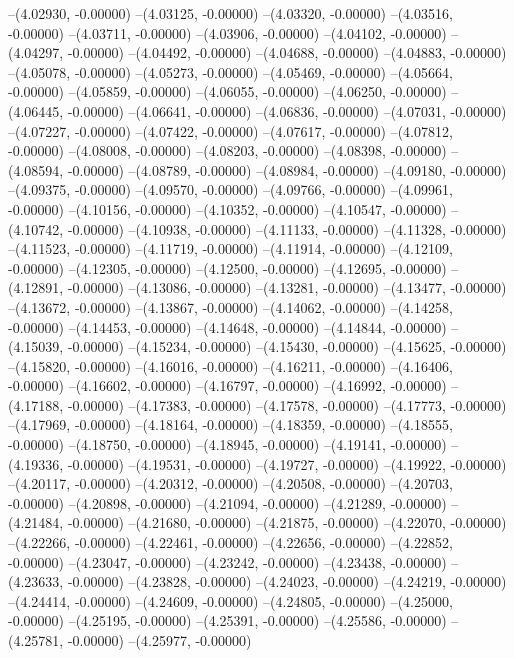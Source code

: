 --(4.02930, -0.00000)
--(4.03125, -0.00000)
--(4.03320, -0.00000)
--(4.03516, -0.00000)
--(4.03711, -0.00000)
--(4.03906, -0.00000)
--(4.04102, -0.00000)
--(4.04297, -0.00000)
--(4.04492, -0.00000)
--(4.04688, -0.00000)
--(4.04883, -0.00000)
--(4.05078, -0.00000)
--(4.05273, -0.00000)
--(4.05469, -0.00000)
--(4.05664, -0.00000)
--(4.05859, -0.00000)
--(4.06055, -0.00000)
--(4.06250, -0.00000)
--(4.06445, -0.00000)
--(4.06641, -0.00000)
--(4.06836, -0.00000)
--(4.07031, -0.00000)
--(4.07227, -0.00000)
--(4.07422, -0.00000)
--(4.07617, -0.00000)
--(4.07812, -0.00000)
--(4.08008, -0.00000)
--(4.08203, -0.00000)
--(4.08398, -0.00000)
--(4.08594, -0.00000)
--(4.08789, -0.00000)
--(4.08984, -0.00000)
--(4.09180, -0.00000)
--(4.09375, -0.00000)
--(4.09570, -0.00000)
--(4.09766, -0.00000)
--(4.09961, -0.00000)
--(4.10156, -0.00000)
--(4.10352, -0.00000)
--(4.10547, -0.00000)
--(4.10742, -0.00000)
--(4.10938, -0.00000)
--(4.11133, -0.00000)
--(4.11328, -0.00000)
--(4.11523, -0.00000)
--(4.11719, -0.00000)
--(4.11914, -0.00000)
--(4.12109, -0.00000)
--(4.12305, -0.00000)
--(4.12500, -0.00000)
--(4.12695, -0.00000)
--(4.12891, -0.00000)
--(4.13086, -0.00000)
--(4.13281, -0.00000)
--(4.13477, -0.00000)
--(4.13672, -0.00000)
--(4.13867, -0.00000)
--(4.14062, -0.00000)
--(4.14258, -0.00000)
--(4.14453, -0.00000)
--(4.14648, -0.00000)
--(4.14844, -0.00000)
--(4.15039, -0.00000)
--(4.15234, -0.00000)
--(4.15430, -0.00000)
--(4.15625, -0.00000)
--(4.15820, -0.00000)
--(4.16016, -0.00000)
--(4.16211, -0.00000)
--(4.16406, -0.00000)
--(4.16602, -0.00000)
--(4.16797, -0.00000)
--(4.16992, -0.00000)
--(4.17188, -0.00000)
--(4.17383, -0.00000)
--(4.17578, -0.00000)
--(4.17773, -0.00000)
--(4.17969, -0.00000)
--(4.18164, -0.00000)
--(4.18359, -0.00000)
--(4.18555, -0.00000)
--(4.18750, -0.00000)
--(4.18945, -0.00000)
--(4.19141, -0.00000)
--(4.19336, -0.00000)
--(4.19531, -0.00000)
--(4.19727, -0.00000)
--(4.19922, -0.00000)
--(4.20117, -0.00000)
--(4.20312, -0.00000)
--(4.20508, -0.00000)
--(4.20703, -0.00000)
--(4.20898, -0.00000)
--(4.21094, -0.00000)
--(4.21289, -0.00000)
--(4.21484, -0.00000)
--(4.21680, -0.00000)
--(4.21875, -0.00000)
--(4.22070, -0.00000)
--(4.22266, -0.00000)
--(4.22461, -0.00000)
--(4.22656, -0.00000)
--(4.22852, -0.00000)
--(4.23047, -0.00000)
--(4.23242, -0.00000)
--(4.23438, -0.00000)
--(4.23633, -0.00000)
--(4.23828, -0.00000)
--(4.24023, -0.00000)
--(4.24219, -0.00000)
--(4.24414, -0.00000)
--(4.24609, -0.00000)
--(4.24805, -0.00000)
--(4.25000, -0.00000)
--(4.25195, -0.00000)
--(4.25391, -0.00000)
--(4.25586, -0.00000)
--(4.25781, -0.00000)
--(4.25977, -0.00000)
